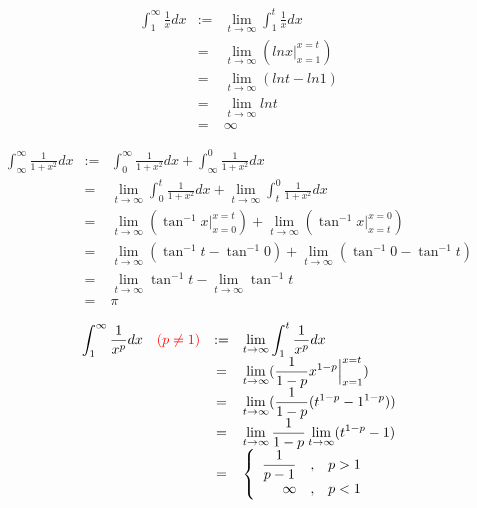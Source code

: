 \begin{eg}
\[\begin{array}{rcl}
\displaystyle \int^\infty_1 \frac{1}{x} dx & := & \displaystyle \lim_{t \to \infty} \int^t_1 \frac{1}{x} dx\\
& = & \displaystyle \lim_{t \to \infty} (ln x \Big|^{x = t}_{x = 1})\\
& = & \displaystyle \lim_{t \to \infty} (ln t - ln 1)\\
& = & \displaystyle \lim_{t \to \infty} ln t \\
& = &  \displaystyle \infty
\end{array}\]
\end{eg}
\begin{eg}
\[\begin{array}{rcl}
\displaystyle \int^\infty_\infty \frac{1}{1+x^2} dx & := & \displaystyle \int^\infty_0 \frac{1}{1+x^2} dx + \int^0_\infty \frac{1}{1+x^2} dx\\
& = & \displaystyle \lim_{t \to \infty} \int^t_0 \frac{1}{1+x^2} dx + \lim_{t \to \infty} \int^0_t \frac{1}{1+x^2} dx\\
& = & \displaystyle \lim_{t \to \infty} (\tan^{-1} x \Big|^{x=t}_{x=0}) + \lim_{t \to \infty} (\tan^{-1} x \Big|^{x=0}_{x=t})\\
& = & \displaystyle \lim_{t \to \infty} (\tan^{-1} t - \tan^{-1} 0) + \lim_{t \to \infty} (\tan^{-1} 0 - \tan^{-1} t)\\
& = & \displaystyle \lim_{t \to \infty} \tan^{-1} t - \lim_{t \to \infty} \tan^{-1} t\\ 
& = & \displaystyle \pi
\end{array}\]
\end{eg}
\begin{eg}
\[\begin{array}{rcl}
\displaystyle \int^\infty_1 \frac{1}{x^p} dx \quad \color{red}{(p \neq 1)} & := & \displaystyle \lim_{t \to \infty} \int^t_1 \frac{1}{x^p} dx\\
& = & \displaystyle \lim_{t \to \infty} (\frac{1}{1-p} x^{1-p} \Big|^{x=t}_{x=1})\\
& = & \displaystyle \lim_{t \to \infty} (\frac{1}{1-p} (t^{1-p} -1^{1-p}))\\
& = & \displaystyle \lim_{t \to \infty} \frac{1}{1-p} \lim_{t \to \infty} (t^{1-p} -1)\\
&= & \displaystyle \left\{ \begin{array}{rcl}
\displaystyle \frac{1}{p-1} & , & p > 1\\
\infty & , & p < 1
\end{array}\right.
\end{array}\]
\end{eg}
